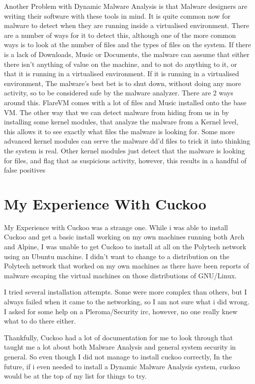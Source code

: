 \documentclass{article}
\begin{document}
Another Problem with Dynamic Malware Analysis is that Malware designers are 
writing their software with these tools in mind. It is quite common now for
malware to detect when they are running inside a virtualised environment. 
There are a number of ways for it to detect this, although one of the
more common ways is to look at the number of files and the types of files on 
the system. If there is a lack of Downloads, Music or Documents, the malware 
can assume that either there isn't anything of value on the machine, and to not
do anything to it, or that it is running in a virtualised environment. If it is
running in a virtualised environment, The malware's best bet is to shut down,
without doing any more activity, so to be considered safe by the malware
analyzer. There are 2 ways around this. FlareVM comes with a lot of files 
and Music installed onto the base VM. The other way that we can detect malware
from hiding from us in by installing some kernel modules, that analyze the 
malware from a Kernel level, this allows it to see exactly what files the 
malware is looking for. Some more advanced kernel modules can serve the 
malware dd'd files to trick it into thinking the system is real. Other
 kernel modules just detect that the malware is looking for files, and 
 flag that as suspicious activity, however, this results in a handful of
 false positives

\section*{My Experience With Cuckoo}

My Experience with Cuckoo was a strange one. While i was able to install
Cuckoo and get a basic install working on my own machines running both Arch 
and Alpine, I was unable to get Cuckoo to install at all on the Polytech
network using an Ubuntu machine. I didn't want to change to a distribution on
the Polytech network that worked on my own machines as there have been reports
of malware escaping the virtual machines on those distributions of GNU/Linux.

I tried several installation attempts. Some were more complex than others, but
I always failed when it came to the networking, so I am not sure what i did
wrong. I asked for some help on a Pleroma/Security irc, however, no one really
knew what to do there either.


Thankfully, Cuckoo had a lot of documentation for me to look through that
taught me a lot about both Malware Analysis and general system security in 
general. So even though I did not manage to install cuckoo correctly, In the
future, if i even needed to install a Dynamic Malware Analysis system, cuckoo
would be at the top of my list for things to try.
\end{document}
